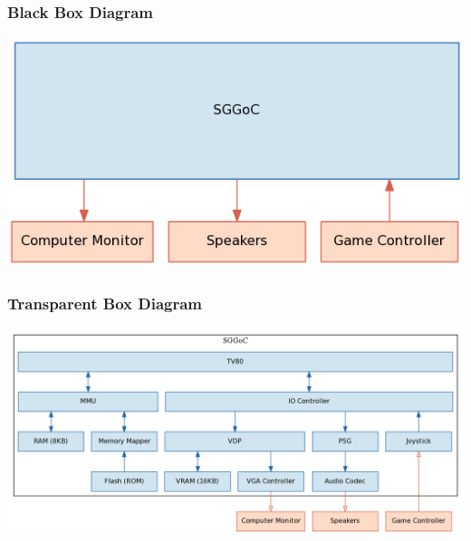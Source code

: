 \documentclass{beamer}
\begin{document}
\begin{frame}
    \frametitle{Black Box Diagram}
    \begin{center}
        \includegraphics[width=\textwidth]{../block_diagrams/block_diagram_external.png}
    \end{center}
\end{frame}

\begin{frame}
    \frametitle{Transparent Box Diagram}
    \begin{center}
        \includegraphics[width=\textwidth]{../block_diagrams/block_diagram_internal.png}
    \end{center}
\end{frame}
\end{document}
